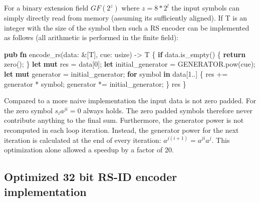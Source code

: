 \documentclass[
]{article}
\newenvironment{Shaded}{}{}
\newcommand{\DataTypeTok}[1]{\textcolor[rgb]{0.56,0.13,0.00}{#1}}
\newcommand{\DecValTok}[1]{\textcolor[rgb]{0.25,0.63,0.44}{#1}}
\newcommand{\KeywordTok}[1]{\textcolor[rgb]{0.00,0.44,0.13}{\textbf{#1}}}
\newcommand{\NormalTok}[1]{#1}
\newcommand{\OperatorTok}[1]{\textcolor[rgb]{0.40,0.40,0.40}{#1}}
\begin{document}
For a binary extension field \(GF(2^z)\) where \(z=8*2^l\) the input
symbols can simply directly read from memory (assuming its sufficiently
aligned). If T is an integer with the size of the symbol then such a RS
encoder can be implemented as follows (all arithmetic is performed in
the finite field):

\begin{Shaded}
\begin{Highlighting}[]
\KeywordTok{pub} \KeywordTok{fn}\NormalTok{ encode\_rs(data}\OperatorTok{:} \OperatorTok{\&}\NormalTok{[T]}\OperatorTok{,}\NormalTok{ cue}\OperatorTok{:} \DataTypeTok{usize}\NormalTok{) }\OperatorTok{{-}\textgreater{}}\NormalTok{ T }\OperatorTok{\{}
    \KeywordTok{if}\NormalTok{ data}\OperatorTok{.}\NormalTok{is\_empty() }\OperatorTok{\{}
        \KeywordTok{return}\NormalTok{ zero()}\OperatorTok{;}
    \OperatorTok{\}}
    \KeywordTok{let} \KeywordTok{mut}\NormalTok{ res }\OperatorTok{=}\NormalTok{ data[}\DecValTok{0}\NormalTok{]}\OperatorTok{;}
    \KeywordTok{let}\NormalTok{ initial\_generator }\OperatorTok{=}\NormalTok{ GENERATOR}\OperatorTok{.}\NormalTok{pow(cue)}\OperatorTok{;}
    \KeywordTok{let} \KeywordTok{mut}\NormalTok{ generator }\OperatorTok{=}\NormalTok{ initial\_generator}\OperatorTok{;}
    \KeywordTok{for}\NormalTok{ symbol }\KeywordTok{in}\NormalTok{ data[}\DecValTok{1}\OperatorTok{..}\NormalTok{] }\OperatorTok{\{}
\NormalTok{        res }\OperatorTok{+=}\NormalTok{ generator }\OperatorTok{*}\NormalTok{ symbol}\OperatorTok{;}
\NormalTok{        generator }\OperatorTok{*=}\NormalTok{ initial\_generator}\OperatorTok{;}
    \OperatorTok{\}}
\NormalTok{    res}
\OperatorTok{\}}
\end{Highlighting}
\end{Shaded}

Compared to a more naive implementation the input data is not zero
padded. For the zero symbol \(s_i a^{j i} = 0\) always holds. The zero
padded symbols therefore never contribute anything to the final sum.
Furthermore, the generator power is not recomputed in each loop
iteration. Instead, the generator power for the next iteration is
calculated at the end of every iteration:
\(a^{j (i + 1)} = a^{j i} a^{j}\). This optimization alone allowed a
speedup by a factor of 20.

\hypertarget{optimized-32-bit-rs-id-encoder-implementation}{%
\subsection{Optimized 32 bit RS-ID encoder
implementation}\label{optimized-32-bit-rs-id-encoder-implementation}}
\end{document}
